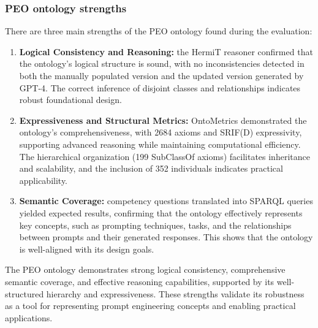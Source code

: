 \subsubsection{PEO ontology strengths}
There are three main strengths of the PEO ontology found during the evaluation:
\begin{enumerate}
    \item \textbf{Logical Consistency and Reasoning:} the HermiT reasoner confirmed that the ontology's logical structure is sound, with no inconsistencies detected in both the manually populated version and the updated version generated by GPT-4. The correct inference of disjoint classes and relationships indicates robust foundational design.

    \item \textbf{Expressiveness and Structural Metrics:} OntoMetrics demonstrated the ontology’s comprehensiveness, with 2684 axioms and SRIF(D) expressivity, supporting advanced reasoning while maintaining computational efficiency. The hierarchical organization (199 SubClassOf axioms) facilitates inheritance and scalability, and the inclusion of 352 individuals indicates practical applicability.

    \item \textbf{Semantic Coverage:} competency questions translated into SPARQL queries yielded expected results, confirming that the ontology effectively represents key concepts, such as prompting techniques, tasks, and the relationships between prompts and their generated responses. This shows that the ontology is well-aligned with its design goals.
\end{enumerate}
The PEO ontology demonstrates strong logical consistency, comprehensive semantic coverage, and effective reasoning capabilities, supported by its well-structured hierarchy and expressiveness. These strengths validate its robustness as a tool for representing prompt engineering concepts and enabling practical applications.

